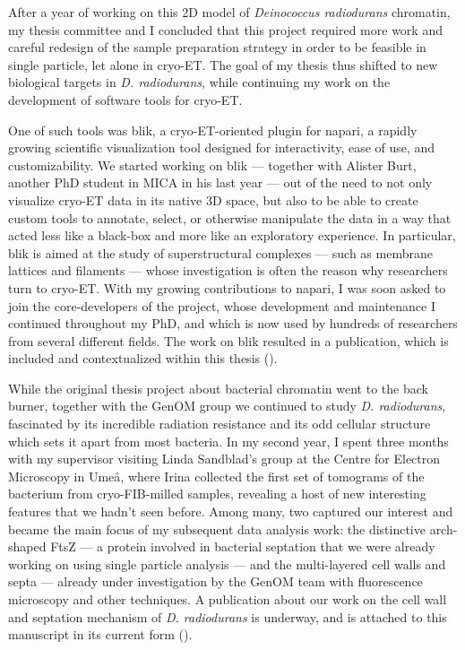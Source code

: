 After a year of working on this 2D model of \textit{Deinococcus radiodurans} chromatin, my thesis committee and I concluded that this project required more work and careful redesign of the sample preparation strategy in order to be feasible in single particle, let alone in cryo-ET.
The goal of my thesis thus shifted to new biological targets in \textit{D. radiodurans}, while continuing my work on the development of software tools for cryo-ET.

One of such tools was blik, a cryo-ET-oriented plugin for napari, a rapidly growing scientific visualization tool designed for interactivity, ease of use, and customizability.
We started working on blik --- together with Alister Burt, another PhD student in MICA in his last year --- out of the need to not only visualize cryo-ET data in its native 3D space, but also to be able to create custom tools to annotate, select, or otherwise manipulate the data in a way that acted less like a black-box and more like an exploratory experience.
In particular, blik is aimed at the study of superstructural complexes --- such as membrane lattices and filaments --- whose investigation is often the reason why researchers turn to cryo-ET.
With my growing contributions to napari, I was soon asked to join the core-developers of the project, whose development and maintenance I continued throughout my PhD, and which is now used by hundreds of researchers from several different fields.
The work on blik resulted in a publication, which is included and contextualized within this thesis ().

While the original thesis project about bacterial chromatin went to the back burner, together with the GenOM group we continued to study \textit{D. radiodurans}, fascinated by its incredible radiation resistance and its odd cellular structure which sets it apart from most bacteria.
In my second year, I spent three months with my supervisor visiting Linda Sandblad's group at the Centre for Electron Microscopy in Umeå, where Irina collected the first set of tomograms of the bacterium from cryo-FIB-milled samples, revealing a host of new interesting features that we hadn't seen before.
Among many, two captured our interest and became the main focus of my subsequent data analysis work: the distinctive arch-shaped FtsZ --- a protein involved in bacterial septation that we were already working on using single particle analysis --- and the multi-layered cell walls and septa --- already under investigation by the GenOM team with fluorescence microscopy and other techniques.
A publication about our work on the cell wall and septation mechanism of \textit{D. radiodurans} is underway, and is attached to this manuscript in its current form ().

